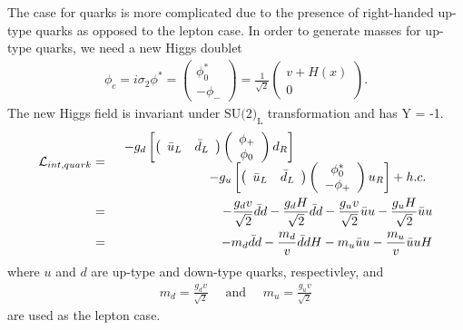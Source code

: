The case for quarks is more complicated due to the presence of right-handed up-type 
quarks as opposed to the lepton case. In order to generate masses for up-type 
quarks, we need a new Higgs doublet 
\begin{eqnarray} 
\phi_c 
= i \sigma_2 \phi^* 
=  \left(  \begin{array}{c} \phi_0^* \\ -\phi_- \end{array} \right) 
=  \frac{1}{\sqrt{2}} \left(  \begin{array}{c} v + H(x) \\ 0 \end{array} \right). 
\end{eqnarray} 
The new Higgs field is invariant under $\textrm{SU(2)}_\textrm{L}$ transformation and has Y = -1. 
\begin{eqnarray} 
\mathcal{L}_{int, quark} 
&=& 
\begin{array}{ccc} \multicolumn{2}{c}{\displaystyle 
-g_{d} \left[ 
\left(  \begin{array}{cc} \bar{u}_L & \bar{d}_L \end{array} \right)
\left(  \begin{array}{c} \phi_+  \\ \phi_0 \end{array} \right) d_R  \right]
} & \\ & \multicolumn{2}{c}{\hspace{2cm} \displaystyle
-g_{u} \left[ 
\left(  \begin{array}{cc} \bar{u}_L & \bar{d}_L \end{array} \right)
\left(  \begin{array}{c} \phi_0^*  \\ -\phi_+ \end{array} \right) u_R  \right] 
+ h.c. 
} \end{array}   \\ 
&=&  
-\frac{g_d v}{\sqrt{2}} \bar{d}d - \frac{g_d H}{\sqrt{2}} \bar{d}d  
-\frac{g_u v}{\sqrt{2}} \bar{u}u - \frac{g_u H}{\sqrt{2}} \bar{u}u \\
&=&  
- m_d \bar{d}d  -\frac{m_d}{v} \bar{d}d H
- m_u \bar{u}u  -\frac{m_u}{v} \bar{u}u H
\end{eqnarray} 
where $u$ and $d$ are up-type and down-type quarks, respectivley, and   
\begin{eqnarray} 
m_d = \frac{g_d v}{\sqrt{2}} \quad \textrm{ and } \quad   
m_u = \frac{g_u v}{\sqrt{2}}
\end{eqnarray} 
are used as the lepton case. 


